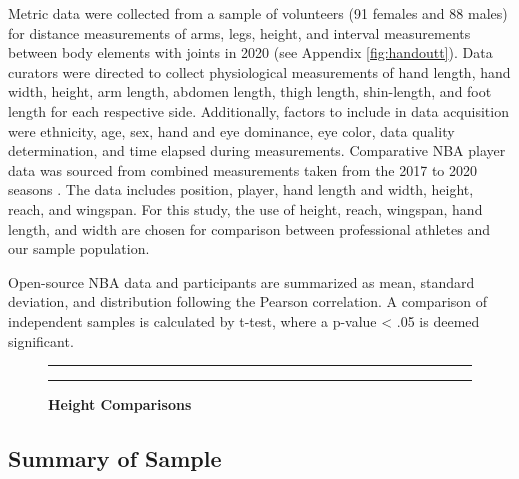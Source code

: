 \documentclass[]{article}
\begin{document}
Metric data were collected from a sample of volunteers (91 females and
88 males) for distance measurements of arms, legs, height, and interval
measurements between body elements with joints in 2020 (see Appendix
\ref{fig:handoutt}). Data curators were directed to collect
physiological measurements of hand length, hand width, height, arm
length, abdomen length, thigh length, shin-length, and foot length for
each respective side. Additionally, factors to include in data
acquisition were ethnicity, age, sex, hand and eye dominance, eye color,
data quality determination, and time elapsed during measurements.
Comparative NBA player data was sourced from combined measurements taken
from the 2017 to 2020 seasons \citep{NBA:Stats}. The data includes
position, player, hand length and width, height, reach, and wingspan.
For this study, the use of height, reach, wingspan, hand length, and
width are chosen for comparison between professional athletes and our
sample population.

Open-source NBA data and participants are summarized as mean, standard
deviation, and distribution following the Pearson correlation. A
comparison of independent samples is calculated by t-test, where a
p-value \textless{} .05 is deemed significant.

\begin{figure}[!ht]
    \hrule
    \caption{ \textbf{Height Comparisons} }
    \begin{center}
    \end{center}
    \label{fig:comparison}
    \hrule
\end{figure}

\subsection{Summary of Sample}
\label{sec:data-sample}
\end{document}
